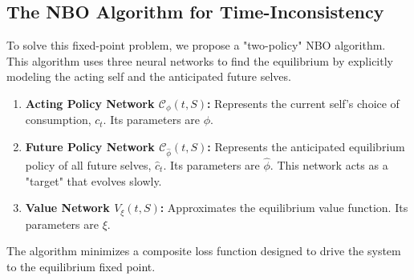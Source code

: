 \documentclass[ecta,draft]{econsocart}
\theoremstyle{plain}
\theoremstyle{remark}
\begin{document}
\subsection{The NBO Algorithm for Time-Inconsistency}

To solve this fixed-point problem, we propose a "two-policy" NBO algorithm. This algorithm uses three neural networks to find the equilibrium by explicitly modeling the acting self and the anticipated future selves.

\begin{enumerate}
    \item \textbf{Acting Policy Network $\mathcal{C}_{\phi}(t,S)$:} Represents the current self's choice of consumption, $c_t$. Its parameters are $\phi$.
    \item \textbf{Future Policy Network $\mathcal{C}_{\hat{\phi}}(t,S)$:} Represents the anticipated equilibrium policy of all future selves, $\hat{c}_t$. Its parameters are $\hat{\phi}$. This network acts as a "target" that evolves slowly.
    \item \textbf{Value Network $V_{\xi}(t,S)$:} Approximates the equilibrium value function. Its parameters are $\xi$.
\end{enumerate}

The algorithm minimizes a composite loss function designed to drive the system to the equilibrium fixed point.
\end{document}
